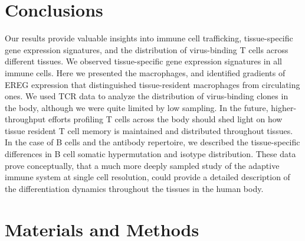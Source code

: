 \section{Conclusions}

Our results provide valuable insights into immune cell trafficking, tissue-specific gene expression signatures, and the distribution of virus-binding T cells across different tissues. We observed tissue-specific gene expression signatures in all immune cells. Here we presented the macrophages, and identified gradients of EREG expression that distinguished tissue-resident macrophages from circulating ones. We used TCR data to analyze the distribution of virus-binding clones in the body, although we were quite limited by low sampling. In the future, higher-throughput efforts profiling T cells across the body should shed light on how tissue resident T cell memory is maintained and distributed throughout tissues. In the case of B cells and the antibody repertoire, we described the tissue-specific differences in B cell somatic hypermutation and isotype distribution. These data prove conceptually, that a much more deeply sampled study of the adaptive immune system at single cell resolution, could provide a detailed description of the differentiation dynamics throughout the tissues in the human body.

\section{Materials and Methods}
